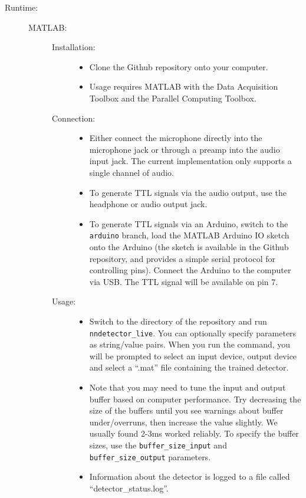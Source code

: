\documentclass[10pt,letterpaper]{article}
\begin{document}
\begin{description}
\item[Runtime:]\hfill
  \begin{description}
    
  \item[MATLAB:]\hfill
    \begin{description}
    \item[Installation:]\hfill
      \begin{itemize}
      \item Clone the Github repository onto your computer.
      \item Usage requires MATLAB with the Data Acquisition Toolbox and the 
      Parallel Computing Toolbox.
      \end{itemize}
    \item[Connection:]\hfill
      \begin{itemize}
      \item Either connect the microphone directly into the microphone jack or through a 
      preamp into the audio input jack. The current implementation only supports a single 
      channel of audio.
      \item To generate TTL signals via the audio output, use the headphone or audio output
      jack.
      \item To generate TTL signals via an Arduino, switch to the {\tt arduino} branch, 
      load the MATLAB Arduino IO sketch onto the Arduino (the sketch is available in the 
      Github repository, and provides a simple serial protocol for controlling pins). 
      Connect the Arduino to the computer via USB. The TTL signal will be available on
      pin 7.
      \end{itemize}
    \item[Usage:]\hfill
      \begin{itemize}
      \item Switch to the directory of the repository and run {\tt nndetector\_live}. You
      can optionally specify parameters as string/value pairs. When you run the command,
      you will be prompted to select an input device, output device and select a ``.mat''
      file containing the trained detector.
      \item Note that you may need to tune the input and output buffer based on computer 
      performance. Try decreasing the size of the buffers until you see warnings about buffer
      under/overruns, then increase the value slightly. We usually found 2-3ms worked reliably.
      To specify the buffer sizes, use the {\tt buffer\_size\_input} and 
      {\tt buffer\_size\_output} parameters.
      \item Information about the detector is logged to a file called ``detector\_status.log''.
      \end{itemize}
    \end{description}
    

\end{description}
\end{description}
\end{document}
